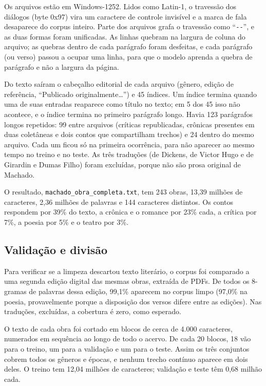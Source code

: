 \documentclass[conference]{IEEEtran}
\begin{document}
Os arquivos estão em Windows-1252. Lidos como Latin-1, o travessão dos diálogos (byte 0x97) vira um caractere de controle invisível e a marca de fala desaparece do corpus inteiro. Parte dos arquivos grafa o travessão como ``\texttt{-{}-}'', e as duas formas foram unificadas. As linhas quebram na largura de coluna do arquivo; as quebras dentro de cada parágrafo foram desfeitas, e cada parágrafo (ou verso) passou a ocupar uma linha, para que o modelo aprenda a quebra de parágrafo e não a largura da página.

Do texto saíram o cabeçalho editorial de cada arquivo (gênero, edição de referência, ``Publicado originalmente\ldots'') e 45 índices. Um índice termina quando uma de suas entradas reaparece como título no texto; em 5 dos 45 isso não acontece, e o índice termina no primeiro parágrafo longo. Havia 123 parágrafos longos repetidos: 99 entre arquivos (críticas republicadas, crônicas presentes em duas coletâneas e dois contos que compartilham trechos) e 24 dentro do mesmo arquivo. Cada um ficou só na primeira ocorrência, para não aparecer ao mesmo tempo no treino e no teste. As três traduções (de Dickens, de Victor Hugo e de Girardin e Dumas Filho) foram excluídas, porque não são prosa original de Machado.

O resultado, \texttt{machado\_obra\_completa.txt}, tem 243 obras, 13,39 milhões de caracteres, 2,36 milhões de palavras e 144 caracteres distintos. Os contos respondem por 39\% do texto, a crônica e o romance por 23\% cada, a crítica por 7\%, a poesia por 5\% e o teatro por 3\%.

\subsection{Validação e divisão}

Para verificar se a limpeza descartou texto literário, o corpus foi comparado a uma segunda edição digital das mesmas obras, extraída de PDFs. De todos os 8-gramas de palavras dessa edição, 99,1\% aparecem no corpus limpo (97,0\% na poesia, provavelmente porque a disposição dos versos difere entre as edições). Nas traduções, excluídas, a cobertura é zero, como esperado.

O texto de cada obra foi cortado em blocos de cerca de 4.000 caracteres, numerados em sequência ao longo de todo o acervo. De cada 20 blocos, 18 vão para o treino, um para a validação e um para o teste. Assim os três conjuntos cobrem todos os gêneros e épocas, e nenhum trecho contínuo aparece em dois deles. O treino tem 12,04 milhões de caracteres; validação e teste têm 0,68 milhão cada.
\end{document}
